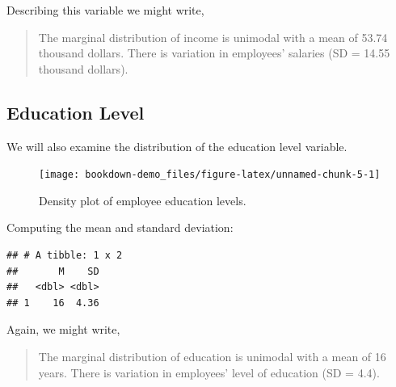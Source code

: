 \documentclass[]{book}
\newenvironment{Shaded}{\begin{snugshade}}{\end{snugshade}}
\newcommand{\CommentTok}[1]{\textcolor[rgb]{0.56,0.35,0.01}{\textit{#1}}}
\newcommand{\DataTypeTok}[1]{\textcolor[rgb]{0.13,0.29,0.53}{#1}}
\newcommand{\KeywordTok}[1]{\textcolor[rgb]{0.13,0.29,0.53}{\textbf{#1}}}
\newcommand{\NormalTok}[1]{#1}
\newcommand{\OperatorTok}[1]{\textcolor[rgb]{0.81,0.36,0.00}{\textbf{#1}}}
\newcommand{\StringTok}[1]{\textcolor[rgb]{0.31,0.60,0.02}{#1}}
\theoremstyle{definition}
\theoremstyle{definition}
\theoremstyle{definition}
\theoremstyle{remark}
\begin{document}
Describing this variable we might write,

\begin{quote}
The marginal distribution of income is unimodal with a mean of 53.74
thousand dollars. There is variation in employees' salaries (SD = 14.55
thousand dollars).
\end{quote}

\hypertarget{education-level}{%
\subsection{Education Level}\label{education-level}}

We will also examine the distribution of the education level variable.

\begin{Shaded}
\end{Shaded}

\begin{figure}
\texttt{[image: bookdown-demo\_files/figure-latex/unnamed-chunk-5-1]} \caption{Density plot of employee education levels.}\label{fig:unnamed-chunk-5}
\end{figure}

Computing the mean and standard deviation:

\begin{Shaded}
\end{Shaded}

\begin{verbatim}
## # A tibble: 1 x 2
##       M    SD
##   <dbl> <dbl>
## 1    16  4.36
\end{verbatim}

Again, we might write,

\begin{quote}
The marginal distribution of education is unimodal with a mean of 16
years. There is variation in employees' level of education (SD = 4.4).
\end{quote}
\end{document}
